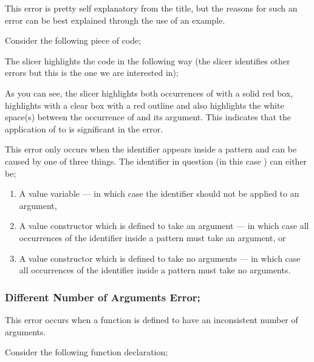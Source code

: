 \documentclass{article}
\begin{document}
\begin{itemize}
\subitem This error is pretty self explanatory from the title, but the
reasons for such an error can be best explained through the use of an
example.

Consider the following piece of code;


The slicer highlights the code in the following way (the slicer
identifies other errors but this is the one we are interested in);


As you can see, the slicer highlights both occurrences of
 with a solid red box, highlights
 with a clear box with a red outline and also
highlights the white space(s) between the occurrence of
 and its argument. This indicates
that the application of  to  is
significant in the error.

This error only occurs when the identifier appears inside a pattern
and can be caused by one of three things. The identifier in
question (in this case ) can either be;

\begin{enumerate}
\item A value variable --- in which case the identifier should not be
  applied to an argument,
\item A value constructor which is defined to take an argument --- in
  which case all occurrences of the identifier inside a pattern must take
  an argument, or
\item A value constructor which is defined to take no arguments --- in
  which case all occurrences of the identifier inside a pattern must take no arguments.
\end{enumerate}

\newpage

\subsubsection{Different Number of Arguments Error;}

\subitem This error occurs when a function is defined to have an
inconsistent number of arguments.

Consider the following function declaration;



\end{itemize}
\end{document}
